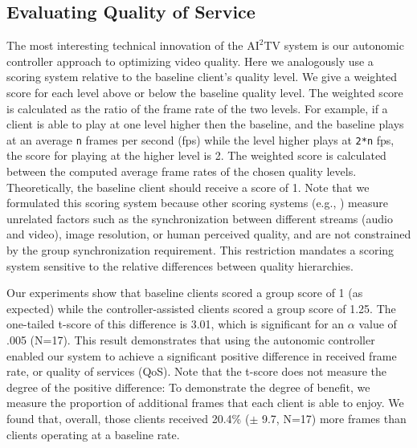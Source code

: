 \documentclass{sig-alternate}
\begin{document}



\subsection{Evaluating Quality of Service} 

The most interesting technical innovation of the $\mathrm{AI}^2$TV
system is our autonomic controller approach to optimizing video
quality.  Here we analogously use a scoring system relative to the
baseline client's quality level.  We give a weighted score for each
level above or below the baseline quality level.  The weighted score
is calculated as the ratio of the frame rate of the two levels.  For
example, if a client is able to play at one level higher then the
baseline, and the baseline plays at an average \texttt{n} frames per
second (fps) while the level higher plays at \texttt{2*n} fps, the
score for playing at the higher level is 2.  The weighted score is
calculated between the computed average frame rates of the chosen
quality levels.  Theoretically, the baseline client should receive a
score of 1.  Note that we formulated this scoring system because other
scoring systems (e.g., \cite{BAQAI,CORTE,CONWAY2000}) measure
unrelated factors such as the synchronization between different
streams (audio and video), image resolution, or human perceived
quality, and are not constrained by the group synchronization
requirement.  This restriction mandates a scoring system sensitive to
the relative differences between quality hierarchies.


Our experiments show that baseline clients scored a group score of 1
(as expected) while the controller-assisted clients scored a group
score of 1.25.  The one-tailed t-score of this difference is 3.01,
which is significant for an $\alpha$ value of .005 (N=17).  This
result demonstrates that using the autonomic controller enabled our
system to achieve a significant positive difference in received frame
rate, or quality of services (QoS).  Note that the t-score does not
measure the degree of the positive difference: To demonstrate the
degree of benefit, we measure the proportion of additional frames that
each client is able to enjoy.  We found that, overall, those clients
received 20.4\% ($\pm$ 9.7, N=17) more frames than clients operating
at a baseline rate.
\end{document}
